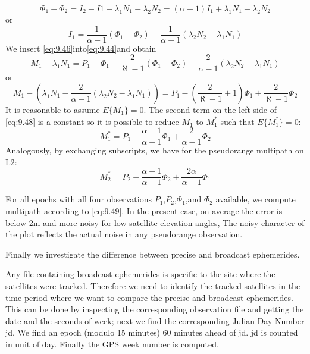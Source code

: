 		\begin{equation}\label{eq:9.45}
			\Phi_1-\Phi_2=I_2-I1+\lambda_1N_1-\lambda_2N_2=(\alpha-1)I_1+\lambda_1N_1-\lambda_2N_2
		\end{equation}
		or
		\begin{equation}\label{eq:9.46}
			I_1=\dfrac{1}{\alpha-1}(\Phi_1-\Phi_2)+\dfrac{1}{\alpha-1}(\lambda_2N_2-\lambda_1N_1)
		\end{equation}
		We insert \ref{eq:9.46}into\ref{eq:9.44}and obtain
		\begin{equation}\label{eq:9.47}
			M_1-\lambda_1N_1=P_1-\Phi_1-\dfrac{2}{\aleph-1}(\Phi_1-\Phi_2)-\dfrac{2}{\alpha-1}(\lambda_2N_2-\lambda_1N_1)
		\end{equation}
		or
		\begin{equation}\label{eq:9.48}
			M_1-(\lambda_1N_1-\dfrac{2}{\alpha-1}(\lambda_2N_2-\lambda_1N_1))=P_1-(\dfrac{2}{\aleph-1}+1)\Phi_1+\dfrac{2}{\aleph-1}\Phi_2
		\end{equation}
		It is reasonable to assume $E\{M_1\} = 0$. The second term on the left side of \ref{eq:9.48} is a constant so it is possible to reduce $M_1$ to $M^*_1$ such that $E\{M^*_1\} = 0$:
		\begin{equation}\label{eq:9.49}
			M^*_1=P_1-\dfrac{\alpha+1}{\alpha-1}\Phi_1+\dfrac{2}{\alpha-1}\Phi_2
		\end{equation}
		Analogously, by exchanging subscripts, we have for the pseudorange multipath on L2:
		\begin{equation}\label{eq:9.50}
			M^*_2=P_2-\dfrac{\alpha+1}{\alpha-1}\Phi_2+\dfrac{2\alpha}{\alpha-1}\Phi_1
		\end{equation}
		
		For all epochs with all four observations $P_1$,$P_2$,$\Phi_1$,and $\Phi_2$ available, we compute multipath according to \ref{eq:9.49}. In the present case, on average the error is below 2m and more noisy for low satellite elevation angles, The noisy character of the plot reflects the actual noise in any pseudorange observation.
		
		Finally we investigate the difference between precise and broadcast ephemerides.
		
		Any file containing broadcast ephemerides is specific to the site where the satellites were tracked. Therefore we need to identify the tracked satellites in the time period where we want to compare the precise and broadcast ephemerides. This can be done by inspecting the corresponding observation file and getting the date and the seconds of week; next we find the corresponding Julian Day Number jd. We find an epoch (modulo 15 minutes) 60 minutes ahead of jd. jd is counted in unit of day. Finally the GPS week number is computed.
		
